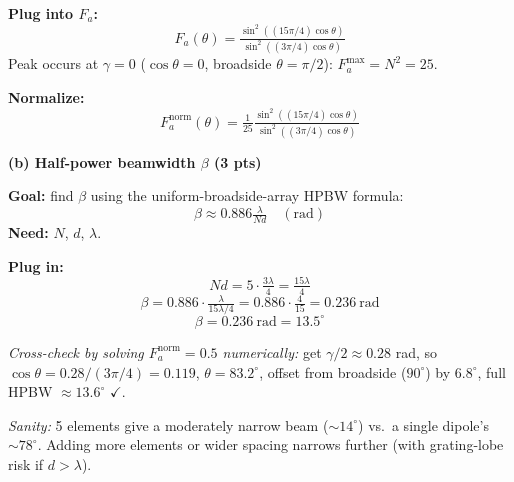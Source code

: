 \documentclass[11pt,letterpaper]{article}
\newcommand{\goal}[1]{\textbf{\color{purple}Goal:} #1}
\newcommand{\need}[1]{\textbf{\color{coral}Need:} #1}
\begin{document}
\textbf{Plug into $F_a$:}
\[F_a(\theta) = \tfrac{\sin^2((15\pi/4)\cos\theta)}{\sin^2((3\pi/4)\cos\theta)}\]
Peak occurs at $\gamma = 0$ ($\cos\theta = 0$, broadside $\theta = \pi/2$): $F_a^{\text{max}} = N^2 = 25$.

\textbf{Normalize:}
\[\boxed{F_a^{\text{norm}}(\theta) = \tfrac{1}{25}\tfrac{\sin^2((15\pi/4)\cos\theta)}{\sin^2((3\pi/4)\cos\theta)}}\]

\vspace{6pt}
\textbf{(b) Half-power beamwidth $\beta$ (3 pts)}

\begin{goalbox}
\goal{find $\beta$ using the uniform-broadside-array HPBW formula:}
\[\beta \approx 0.886\tfrac{\lambda}{Nd}\quad(\text{rad})\]
\need{$N$, $d$, $\lambda$.}
\end{goalbox}

\textbf{Plug in:}
\[Nd = 5\cdot\tfrac{3\lambda}{4} = \tfrac{15\lambda}{4}\]
\[\beta = 0.886\cdot\tfrac{\lambda}{15\lambda/4} = 0.886\cdot\tfrac{4}{15} = 0.236~\text{rad}\]
\[\boxed{\beta = 0.236~\text{rad} = 13.5^\circ}\]

\textit{Cross-check by solving $F_a^{\text{norm}} = 0.5$ numerically:} get $\gamma/2 \approx 0.28$ rad, so $\cos\theta = 0.28/(3\pi/4) = 0.119$, $\theta = 83.2^\circ$, offset from broadside ($90^\circ$) by $6.8^\circ$, full HPBW $\approx 13.6^\circ$ $\checkmark$.

\textit{Sanity:} 5 elements give a moderately narrow beam ($\sim 14^\circ$) vs.\ a single dipole's $\sim 78^\circ$. Adding more elements or wider spacing narrows further (with grating-lobe risk if $d > \lambda$).
\end{document}
